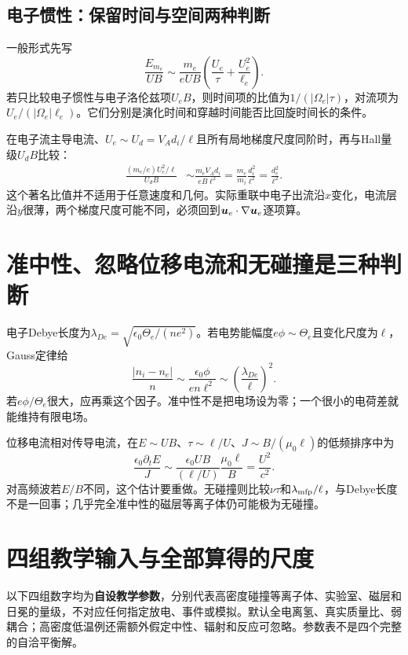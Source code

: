 \subsection{电子惯性：保留时间与空间两种判断}
一般形式先写
\begin{equation}
\frac{E_{m_e}}{UB}\sim\frac{m_e}{eUB}
\left(\frac{U_e}{\tau}+\frac{U_e^2}{\ell_e}\right).
\end{equation}
若只比较电子惯性与电子洛伦兹项$U_eB$，则时间项的比值为$1/(|\Omega_e|\tau)$，对流项为$U_e/(|\Omega_e|\ell_e)$。它们分别是演化时间和穿越时间能否比回旋时间长的条件。

在电子流主导电流、$U_e\sim U_d=V_Ad_i/\ell$且所有局地梯度尺度同阶时，再与Hall量级$U_dB$比较：
\begin{align}
\frac{(m_e/e)U_e^2/\ell}{U_dB}
&\sim\frac{m_eV_Ad_i}{eB\ell^2}
=\frac{m_e}{m_i}\frac{d_i^2}{\ell^2}
=\boxed{\frac{d_e^2}{\ell^2}}.
\end{align}
这个著名比值并不适用于任意速度和几何。实际重联中电子出流沿$x$变化，电流层沿$y$很薄，两个梯度尺度可能不同，必须回到$\bm{u}_e\cdot\nabla\bm{u}_e$逐项算。

\section{准中性、忽略位移电流和无碰撞是三种判断}
电子Debye长度为$\lambda_{De}=\sqrt{\epsilon_0\Theta_e/(ne^2)}$。若电势能幅度$e\phi\sim\Theta_e$且变化尺度为$\ell$，Gauss定律给
\begin{equation}
\frac{|n_i-n_e|}{n}\sim\frac{\epsilon_0\phi}{en\ell^2}
\sim\left(\frac{\lambda_{De}}{\ell}\right)^2.
\end{equation}
若$e\phi/\Theta_e$很大，应再乘这个因子。准中性不是把电场设为零；一个很小的电荷差就能维持有限电场。

位移电流相对传导电流，在$E\sim UB$、$\tau\sim\ell/U$、$J\sim B/(\mu_0\ell)$的低频排序中为
\begin{equation}
\frac{\epsilon_0\partial_tE}{J}
\sim\frac{\epsilon_0 UB}{(\ell/U)}\frac{\mu_0\ell}{B}
=\frac{U^2}{c^2}.
\end{equation}
对高频波若$E/B$不同，这个估计要重做。无碰撞则比较$\nu\tau$和$\lambda_{\rm mfp}/\ell$，与Debye长度不是一回事；几乎完全准中性的磁层等离子体仍可能极为无碰撞。

\section{四组教学输入与全部算得的尺度}
以下四组数字均为\textbf{自设教学参数}，分别代表高密度碰撞等离子体、实验室、磁层和日冕的量级，不对应任何指定放电、事件或模拟。默认全电离氢、真实质量比、弱耦合；高密度低温例还需额外假定中性、辐射和反应可忽略。参数表不是四个完整的自洽平衡解。

